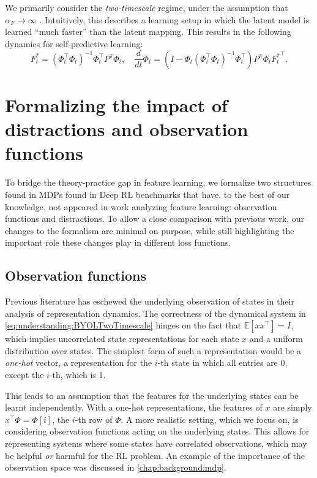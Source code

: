 We primarily consider the \emph{two-timescale} regime, under the assumption that $\alpha_F\to \infty$ \parencite{tang2022understanding}. Intuitively, this describes a learning setup in which the latent model is learned ``much faster'' than the latent mapping. 
This results in the following dynamics for self-predictive learning:
\begin{equation}
    \label{eq:understanding:BYOLTwoTimescale}
    F_t^* = \left(\Phi_t^\top\Phi_t\right)^{-1} \Phi_t^\top P^\pi \Phi_t, \quad \frac{d}{dt}\Phi_t = \left(I-\Phi_t\left(\Phi_t^\top \Phi_t\right)^{-1}\Phi_t^\top\right)P^\pi \Phi_t {F_t^*}^\top.
\end{equation}

\section{Formalizing the impact of distractions and observation functions}
\label{sec:understanding:formalism}
To bridge the theory-practice gap in feature learning, we formalize two structures found in MDPs found in Deep RL benchmarks that have, to the best of our knowledge, not appeared in work analyzing feature learning: observation functions and distractions.
To allow a close comparison with previous work, our changes to the formalism are minimal on purpose, while still highlighting the important role these changes play in different loss functions.

\subsection{Observation functions}
Previous literature \parencite{tang2022understanding,tang2023towards,lelan2022generalization} has eschewed the underlying observation of states in their analysis of representation dynamics. 
The correctness of the dynamical system in \autoref{eq:understanding:BYOLTwoTimescale} hinges on the fact that $\mathbb{E}[xx^\top ] = I$, which implies uncorrelated state representations for each state $x$ and a uniform distribution over states.
The simplest form of such a representation would be a \emph{one-hot} vector, a representation for the $i$-th state in which all entries are 0, except the $i$-th, which is 1.

This leads to an assumption that the features for the underlying states can be learnt independently.
With a one-hot representations, the features of $x$ are simply $x^\top \Phi = \Phi[i]$, the $i$-th row of $\Phi$.
A more realistic setting, which we focus on, is considering observation functions acting on the underlying states. 
This allows for representing systems where some states have correlated observations, which may be helpful \emph{or} harmful for the RL problem. 
An example of the importance of the observation space was discussed in \autoref{chap:background:mdp}.

